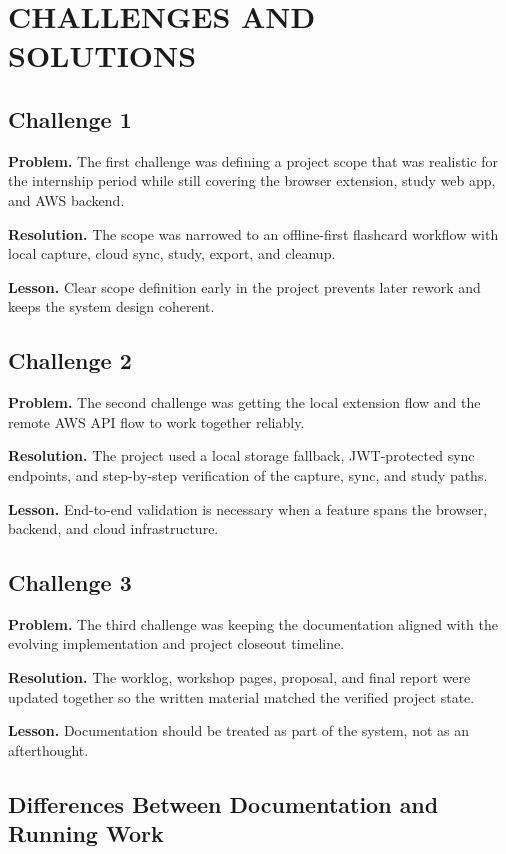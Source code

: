 \chapter{CHALLENGES AND SOLUTIONS}

\section{Challenge 1}

\textbf{Problem.}
The first challenge was defining a project scope that was realistic for the
internship period while still covering the browser extension, study web app,
and AWS backend.

\textbf{Resolution.}
The scope was narrowed to an offline-first flashcard workflow with local
capture, cloud sync, study, export, and cleanup.

\textbf{Lesson.}
Clear scope definition early in the project prevents later rework and keeps the
system design coherent.

\section{Challenge 2}

\textbf{Problem.}
The second challenge was getting the local extension flow and the remote AWS
API flow to work together reliably.

\textbf{Resolution.}
The project used a local storage fallback, JWT-protected sync endpoints, and
step-by-step verification of the capture, sync, and study paths.

\textbf{Lesson.}
End-to-end validation is necessary when a feature spans the browser, backend,
and cloud infrastructure.

\section{Challenge 3}

\textbf{Problem.}
The third challenge was keeping the documentation aligned with the evolving
implementation and project closeout timeline.

\textbf{Resolution.}
The worklog, workshop pages, proposal, and final report were updated together
so the written material matched the verified project state.

\textbf{Lesson.}
Documentation should be treated as part of the system, not as an afterthought.

\section{Differences Between Documentation and Running Work}

